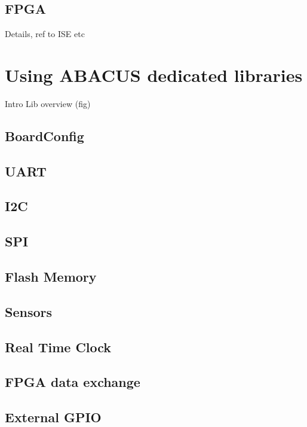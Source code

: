 \documentclass[12pt,a4paper]{report}
\begin{document}
\subsection{FPGA}
Details, ref to ISE etc

\section{Using ABACUS dedicated libraries}
Intro
Lib overview (fig)
\subsection{BoardConfig}
\subsection{UART}
\subsection{I2C}
\subsection{SPI}
\subsection{Flash Memory}
\subsection{Sensors}
\subsection{Real Time Clock}
\subsection{FPGA data exchange}
\subsection{External GPIO}
\end{document}
